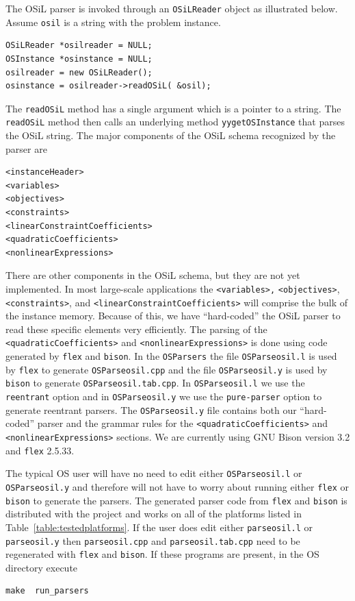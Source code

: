 \documentclass[11pt]{article}
\renewcommand{\_}{{\char"5F}}
\renewcommand{\{}{{\char"7B}}
\renewcommand{\}}{{\char"7D}}
\renewcommand{\^}{{\char"0D}}
\renewcommand{\'}{{\char"0D}}
\begin{document}
\begin{enumerate}[Step 1:]
The OSiL parser is invoked through an {\tt OSiLReader} object as illustrated below. Assume {\tt osil} is a string with the problem instance.
\begin{verbatim}
OSiLReader *osilreader = NULL;
OSInstance *osinstance = NULL;
osilreader = new OSiLReader();
osinstance = osilreader->readOSiL( &osil);
\end{verbatim}
The {\tt  readOSiL} method  has a single argument which is a pointer to a string. The {\tt  readOSiL} method then calls an underlying method {\tt yygetOSInstance} that parses the OSiL string. The major components of the OSiL schema  recognized by the parser are
\begin{verbatim}
<instanceHeader>
<variables>
<objectives>
<constraints>
<linearConstraintCoefficients>
<quadraticCoefficients>
<nonlinearExpressions>
\end{verbatim}
There are other components in the OSiL schema, but they are not yet implemented.
In most large-scale applications the {\tt <variables>,} {\tt <objectives>}, {\tt <constraints>}, and {\tt <linearConstraintCoefficients>}
will comprise the bulk of the instance memory.  Because of this, we have ``hard-coded'' the OSiL parser
to read these specific elements very efficiently.
The parsing of the {\tt <quadraticCoefficients>} and {\tt <nonlinearExpressions>} is done using code generated
by {\tt flex} and {\tt bison}. In the {\tt OSParsers}  the file  
{\tt OSParseosil.l} is used by {\tt flex} to generate {\tt OSParseosil.cpp} and the file 
{\tt OSParseosil.y} is used by {\tt bison} to generate {\tt OSParseosil.tab.cpp}.
In {\tt OSParseosil.l} we use the {\tt reentrant} option and in {\tt OSParseosil.y} we use the
{\tt pure-parser} option to generate reentrant parsers. The {\tt OSParseosil.y} file  contains both our
``hard-coded'' parser and the grammar rules for the  {\tt <quadraticCoefficients>} and
{\tt <nonlinearExpressions>} sections.
We are currently using GNU Bison version 3.2 and {\tt flex} 2.5.33.

The typical OS user will have no need to edit either {\tt OSParseosil.l} or {\tt OSParseosil.y} and therefore will not have to worry about running either {\tt flex} or {\tt bison} to generate the parsers. The generated parser code from {\tt flex} and {\tt bison} is distributed with the project and works on all of the platforms listed in Table~\ref{table:testedplatforms}.  If the user does edit either {\tt parseosil.l} or {\tt parseosil.y} then {\tt parseosil.cpp} and {\tt parseosil.tab.cpp} need to be regenerated with {\tt flex} and {\tt bison}. If these programs are present, in the OS directory  execute
\begin{verbatim}
make  run_parsers
\end{verbatim}


\end{enumerate}
\end{document}
